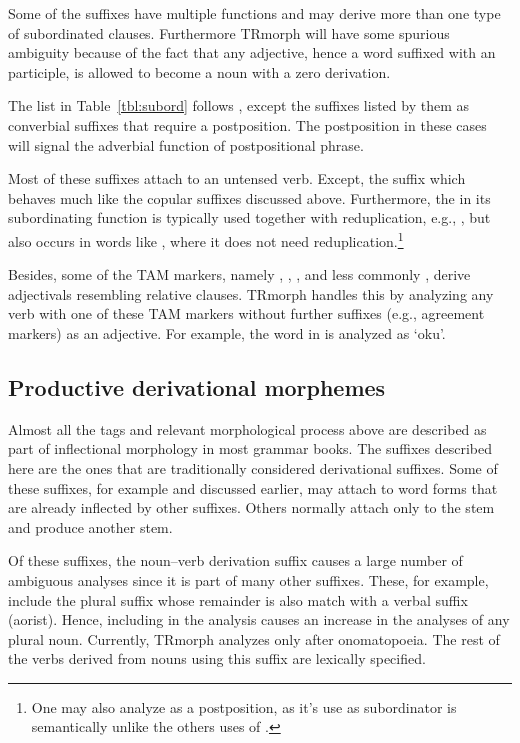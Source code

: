 \documentclass[twocolumn]{article}
\begin{document}
Some of the suffixes have multiple functions and may derive more than
one type of subordinated clauses. Furthermore TRmorph will have some
spurious ambiguity because of the fact that any adjective, hence a
word suffixed with an participle, is allowed to become a noun with a
zero derivation.

The list in Table~\ref{tbl:subord} follows \cite{goksel2005}, except
the suffixes listed by them as converbial suffixes that require a
postposition. The postposition in these cases will signal the
adverbial function of postpositional phrase.

Most of these suffixes attach to an untensed verb. Except, the suffix
 which behaves much like the copular suffixes discussed
above. Furthermore, the  in its subordinating function
is typically used together with reduplication, e.g., , but also occurs in words like
, where it does not need reduplication.\footnote{One may
also analyze  as a postposition, as it's use as
subordinator is semantically unlike the others uses of .}

Besides, some of the TAM markers, namely , ,
,  and less commonly , derive
adjectivals resembling relative clauses. TRmorph handles this by
analyzing any verb with one of these TAM markers without further
suffixes (e.g., agreement markers) as an adjective. For example, the
word  in  is analyzed as
`oku'.

\subsection{Productive derivational morphemes}

Almost all the tags and relevant morphological process above are
described as part of inflectional morphology in most grammar books.
The suffixes described here are the ones that are traditionally
considered derivational suffixes. Some of these suffixes, for example
 and  discussed earlier, may attach to word forms
that are already inflected by other suffixes. Others normally attach
only to the stem and produce another stem.

Of these suffixes, the noun--verb derivation suffix  causes a
large number of ambiguous analyses since it is part of many other
suffixes. These, for example, include the plural suffix 
whose remainder  is also match with a verbal suffix (aorist).
Hence, including  in the analysis causes an increase in the
analyses of any plural noun. Currently, TRmorph analyzes 
only after onomatopoeia. The rest of the verbs derived from nouns
using this suffix are lexically specified.
\end{document}
